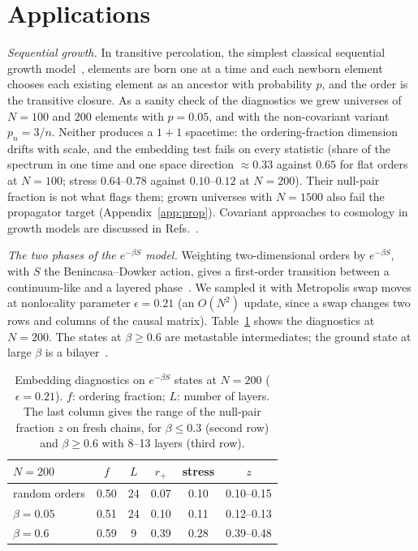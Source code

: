 \documentclass[prd,twocolumn,superscriptaddress,nofootinbib,amsmath,amssymb,floatfix]{revtex4-2}
\begin{document}
\section{Applications}\label{sec:phases}
\emph{Sequential growth.} In transitive percolation, the simplest classical sequential growth model~\cite{RideoutSorkin00}, elements are born one at a time and each newborn element chooses each existing element as an ancestor with probability $p$, and the order is the transitive closure. As a sanity check of the diagnostics we grew universes of $N=100$ and $200$ elements with $p=0.05$, and with the non-covariant variant $p_n=3/n$. Neither produces a $1+1$ spacetime: the ordering-fraction dimension drifts with scale, and the embedding test fails on every statistic (share of the spectrum in one time and one space direction $\approx0.33$ against $0.65$ for flat orders at $N=100$; stress $0.64$--$0.78$ against $0.10$--$0.12$ at $N=200$). Their null-pair fraction is not what flags them; grown universes with $N=1500$ also fail the propagator target (Appendix~\ref{app:prop}). Covariant approaches to cosmology in growth models are discussed in Refs.~\cite{MORS01,AhmedRideout10}.

\emph{The two phases of the $e^{-\beta S}$ model.} Weighting two-dimensional orders by $e^{-\beta S}$, with $S$ the Benincasa--Dowker action, gives a first-order transition between a continuum-like and a layered phase~\cite{BHS08,Surya12,GOS18}. We sampled it with Metropolis swap moves at nonlocality parameter $\epsilon=0.21$ (an $O(N^2)$ update, since a swap changes two rows and columns of the causal matrix). Table~\ref{tab:phases} shows the diagnostics at $N=200$. The states at $\beta\geq0.6$ are metastable intermediates; the ground state at large $\beta$ is a bilayer~\cite{CunninghamSurya19}.

\begin{table}[t]
\caption{Embedding diagnostics on $e^{-\beta S}$ states at $N=200$ ($\epsilon=0.21$). $f$: ordering fraction; $L$: number of layers. The last column gives the range of the null-pair fraction $z$ on fresh chains, for $\beta\le0.3$ (second row) and $\beta\ge0.6$ with 8--13 layers (third row).}
\label{tab:phases}
\begin{ruledtabular}
\begin{tabular}{lccccc}
$N=200$ & $f$ & $L$ & $r_+$ & stress & $z$\\
\hline
random orders & 0.50 & 24 & 0.07 & 0.10 & 0.10--0.15\\
$\beta=0.05$ & 0.51 & 24 & 0.10 & 0.11 & 0.12--0.13\\
$\beta=0.6$ & 0.59 & 9 & 0.39 & 0.28 & 0.39--0.48\\
\end{tabular}
\end{ruledtabular}
\end{table}
\end{document}

